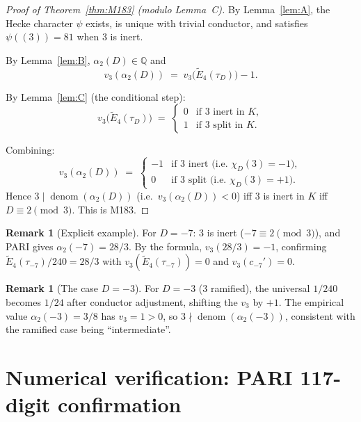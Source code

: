 \documentclass[12pt]{amsart}
\theoremstyle{definition}
\newtheorem{remark}[theorem]{Remark}
\DeclareMathOperator{\denom}{denom}
\newcommand{\Q}{\mathbb{Q}}
\begin{document}
\begin{proof}[Proof of Theorem~\textup{\ref{thm:M183}} (modulo Lemma~C)]
  By Lemma~\ref{lem:A}, the Hecke character $\psi$ exists, is unique with
  trivial conductor, and satisfies $\psi((3)) = 81$ when $3$ is inert.

  By Lemma~\ref{lem:B}, $\alpha_2(D) \in \Q$ and
  \[
    v_3(\alpha_2(D)) \;=\; v_3\!\bigl(\widetilde{E}_4(\tau_D)\bigr) - 1.
  \]

  By Lemma~\ref{lem:C} (the conditional step):
  \[
    v_3\!\bigl(\widetilde{E}_4(\tau_D)\bigr) \;=\;
    \begin{cases} 0 & \text{if } 3 \text{ inert in } K, \\
                  1 & \text{if } 3 \text{ split in } K. \end{cases}
  \]

  Combining:
  \[
    v_3(\alpha_2(D)) \;=\;
    \begin{cases} -1 & \text{if } 3 \text{ inert (i.e.\ } \chi_D(3) = -1),\\
                   0 & \text{if } 3 \text{ split (i.e.\ } \chi_D(3) = +1). \end{cases}
  \]
  Hence $3 \mid \denom(\alpha_2(D))$ (i.e.\ $v_3(\alpha_2(D)) < 0$) iff $3$
  is inert in $K$ iff $D \equiv 2 \pmod{3}$.
  This is M183.
\end{proof}

\begin{remark}[Explicit example]
  For $D = -7$: $3$ is inert ($-7 \equiv 2 \pmod 3$), and PARI gives
  $\alpha_2(-7) = 28/3$.
  By the formula, $v_3(28/3) = -1$, confirming $\widetilde{E}_4(\tau_{-7})
  / 240 = 28/3$ with $v_3(\widetilde{E}_4(\tau_{-7})) = 0$ and
  $v_3(c_{-7}') = 0$.
\end{remark}

\begin{remark}[The case $D = -3$]
  For $D = -3$ ($3$ ramified), the universal $1/240$ becomes $1/24$ after
  conductor adjustment, shifting the $v_3$ by $+1$.
  The empirical value $\alpha_2(-3) = 3/8$ has $v_3 = 1 > 0$, so $3 \nmid
  \denom(\alpha_2(-3))$, consistent with the ramified case being
  ``intermediate''.
\end{remark}

\section{Numerical verification: PARI 117-digit confirmation}
\label{sec:pari}
\end{document}
